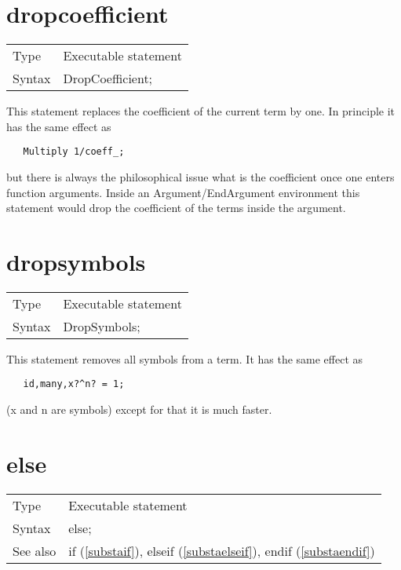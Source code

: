 
\section{dropcoefficient}
\label{substadropcoefficient}

\noindent \begin{tabular}{ll}
Type & Executable statement\\
Syntax & DropCoefficient;
\end{tabular} \vspace{4mm}

\noindent This statement replaces the coefficient of the current term by 
one. In principle it has the same effect as
\begin{verbatim}
   Multiply 1/coeff_;
\end{verbatim}
but there is always the philosophical issue what is the coefficient once 
one enters function arguments. Inside an 
Argument/EndArgument environment this 
statement would drop the coefficient of the terms inside the argument.
\vspace{10mm}


\section{dropsymbols}
\label{substadropsymbols}

\noindent \begin{tabular}{ll}
Type & Executable statement\\
Syntax & DropSymbols;
\end{tabular} \vspace{4mm}

\noindent This statement removes all symbols from a term. 
It has the same effect as
\begin{verbatim}
   id,many,x?^n? = 1;
\end{verbatim}
(x and n are symbols) except for that it is much faster.
\vspace{10mm}


\section{else}
\label{substaelse}

\noindent \begin{tabular}{ll}
Type & Executable statement\\
Syntax & else;
\\ See also & if (\ref{substaif}),
              elseif (\ref{substaelseif}),
              endif (\ref{substaendif})
\end{tabular} \vspace{4mm}

